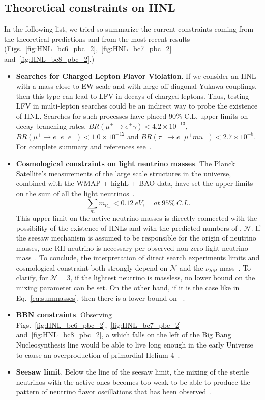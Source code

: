 \subsection{Theoretical constraints on HNL}
In the following list, we tried so summarize the current constraints
coming from the theoretical predictions and from the most recent results (Figs.~\ref{fig:HNL_bc6_pbc_2},~\ref{fig:HNL_bc7_pbc_2}
and~\ref{fig:HNL_bc8_pbc_2}.)
\begin{itemize}
\item \textbf{Searches for Charged Lepton Flavor Violation}. If we consider an HNL with a
  mass close to EW scale and with large off-diagonal Yukawa couplings,
  then this type \hnl can lead to LFV in decays of charged leptons. Thus,
  testing LFV in multi-lepton searches could be an indirect way to
  probe the existence of HNL. Searches for such processes have
  placed 90\% C.L. upper limits on decay branching rates, \ie
  $BR(\mu^+\rightarrow e^+\gamma) < 4.2\times 10^{-13}$,
  $BR(\mu^+\rightarrow e^+e^+e^-) < 1.0\times 10^{-12}$ and
  $BR(\tau^-\rightarrow e^-\mu^+mu^-) < 2.7\times 10^{-8}$. For
  complete summary and references see~\cite{Pascoli_2019}.
\item \textbf{Cosmological constraints on light neutrino masses}. The Planck
  Satellite's measurements of the large scale structures in the
  universe, combined with the WMAP + highL + BAO data, have set the
  upper limits on the sum of all the light
  neutrinos~\cite{Aghanim:2018eyx}.
\begin{equation}
\label{eq:summasses}
\sum_{m} m_{\nu_m} < 0.12 \: eV, \;\;\;\; at \;95\% \: C.L.
\end{equation}
This upper limit on the active neutrino masses is directly connected
with the possibility of the existence of HNLs and with the predicted
numbers of \hnl, $\mathcal{N}$.
If the seesaw mechanism is assumed to be responsible for the origin of neutrino masses,
one RH neutrino is necessary per observed non-zero light
neutrino mass~\cite{Alekhin_2016}.
To conclude, the interpretation of direct search experiments limits and cosmological constraint both strongly
depend on $\mathcal{N}$ and the $\nu_{SM}$
mass~\cite{DREWES2017250,drewes2015theoretical}. To clarify, for
$\mathcal{N}=3$, if the lightest neutrino is massless, no
lower bound on the mixing parameter \mixpar can be set.
On the other hand, if it is the case like in Eq.~\ref{eq:summasses}, then there is a lower
bound on \mixpar~\cite{DREWES2017250}.
\item \textbf{BBN constraints}. Observing
  Figs.~\ref{fig:HNL_bc6_pbc_2},~\ref{fig:HNL_bc7_pbc_2}
  and~\ref{fig:HNL_bc8_pbc_2}, a \hnl which falls on the left of the
  Big Bang Nucleosynthesis line would be able to live long enough in
  the early Universe to cause an overproduction of primordial
  Helium-4~\cite{Ruchayskiy_2012}.
\item \textbf{Seesaw limit}. Below the line of the seesaw limit, the
  mixing of the sterile neutrinos with the active ones becomes too
  weak to be able to produce the pattern of neutrino flavor oscillations that has been observed~\cite{Canetti_2010}. 
\end{itemize}


